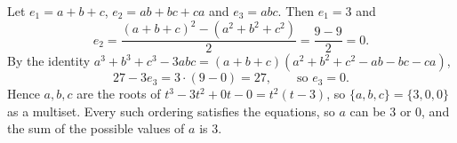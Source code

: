 Let $e_1=a+b+c$, $e_2=ab+bc+ca$ and $e_3=abc$. Then $e_1=3$ and
\[e_2=\dfrac{(a+b+c)^2-\left(a^2+b^2+c^2\right)}{2}=\dfrac{9-9}{2}=0.\]
By the identity $a^3+b^3+c^3-3abc=(a+b+c)\left(a^2+b^2+c^2-ab-bc-ca\right)$,
\[27-3e_3=3\cdot(9-0)=27,\qquad\text{so } e_3=0.\]
Hence $a,b,c$ are the roots of $t^3-3t^2+0t-0=t^2(t-3)$, so $\{a,b,c\}=\{3,0,0\}$ as a multiset. Every such ordering satisfies the equations, so $a$ can be $3$ or $0$, and the sum of the possible values of $a$ is $\boxed{3}$.
